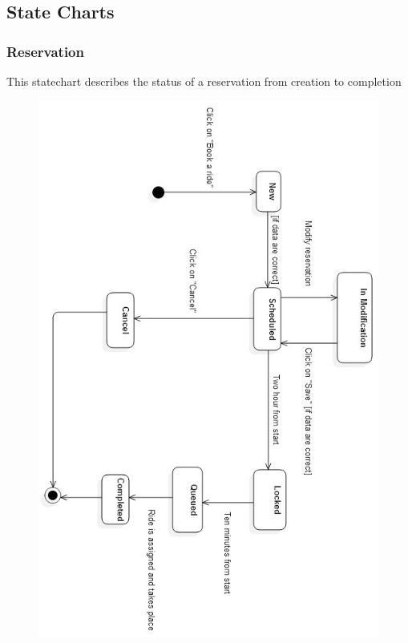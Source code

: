 
\subsection{State Charts}


\subsubsection{Reservation}

This statechart describes the status of a reservation from creation to completion

	\begin{figure}[h!]
		\centering
		\includegraphics[height=0.75\textheight]{"myTaxiServiceImg/SequenceDiagram/Booking"}
	\end{figure}

